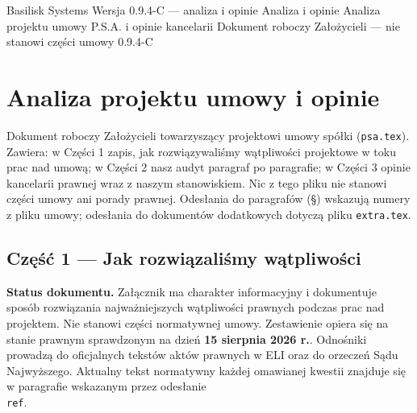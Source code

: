 \documentclass[12pt,a4paper]{report}
\newcounter{paragraf}
\begin{document}
\BusinessPlanTitlePage
  {Basilisk Systems}
  {Wersja 0.9.4-C --- analiza i opinie}
  {Analiza i opinie}
  {Analiza projektu umowy P.S.A. i opinie kancelarii}
  {Dokument roboczy Założycieli --- nie stanowi części umowy}
  {0.9.4-C}

\tableofcontents
\newpage

\chapter*{Analiza projektu umowy i opinie}

Dokument roboczy Założycieli towarzyszący projektowi umowy spółki (\texttt{psa.tex}). Zawiera: w Części 1 zapis, jak rozwiązywaliśmy wątpliwości projektowe w toku prac nad umową; w Części 2 nasz audyt paragraf po paragrafie; w Części 3 opinie kancelarii prawnej wraz z naszym stanowiskiem. Nic z tego pliku nie stanowi części umowy ani porady prawnej. Odesłania do paragrafów (§) wskazują numery z pliku umowy; odesłania do dokumentów dodatkowych dotyczą pliku \texttt{extra.tex}.

\clearpage
\section*{Część 1 — Jak rozwiązaliśmy wątpliwości}
\label{annex:rozwiazane-watpliwosci}

\textbf{Status dokumentu.} Załącznik ma charakter informacyjny i dokumentuje sposób rozwiązania najważniejszych wątpliwości prawnych podczas prac nad projektem. Nie stanowi części normatywnej umowy. Zestawienie opiera się na stanie prawnym sprawdzonym na dzień \textbf{15 sierpnia 2026 r.}. Odnośniki prowadzą do oficjalnych tekstów aktów prawnych w ELI oraz do orzeczeń Sądu Najwyższego. Aktualny tekst normatywny każdej omawianej kwestii znajduje się w paragrafie wskazanym przez odesłanie \texttt{\\ref}.
\end{document}
